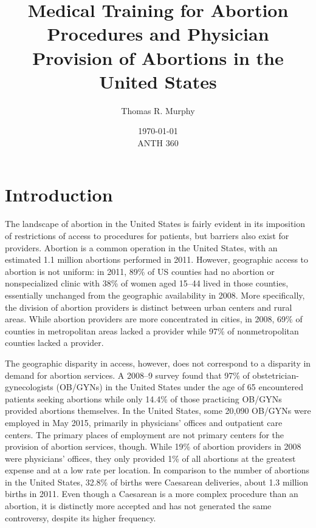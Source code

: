 \documentclass[letterpaper, 12pt]{article}
\title{Medical Training for Abortion Procedures and Physician Provision of Abortions in the United States}
\author{Thomas R. Murphy}
\date{\today\\ANTH 360}
\begin{document}
\maketitle


\section*{Introduction}

The landscape of abortion in the United States is fairly evident in its imposition of restrictions of access to procedures for patients, but barriers also exist for providers.
Abortion is a common operation in the United States, with an estimated 1.1 million abortions performed in 2011. \autocite[pg. 7]{jones_abortion_2014}
However, geographic access to abortion is not uniform: in 2011, 89\% of US counties had no abortion or nonspecialized clinic with 38\% of women aged 15--44 lived in those counties, essentially unchanged from the geographic availability in 2008. \autocite[pg. 7]{jones_abortion_2014}
More specifically, the division of abortion providers is distinct between urban centers and rural areas.
While abortion providers are more concentrated in cities, in 2008, 69\% of counties in metropolitan areas lacked a provider while 97\% of nonmetropolitan counties lacked a provider. \autocite[pg. 46]{jones_abortion_2011}

The geographic disparity in access, however, does not correspond to a disparity in demand for abortion services.
A 2008--9 survey found that 97\% of obstetrician-gynecologists (OB/GYNs) in the United States under the age of 65 encountered patients seeking abortions while only 14.4\% of those practicing OB/GYNs provided abortions themselves. \autocite[pg. 611]{stulberg_abortion_2011}
In the United States, some 20,090 OB/GYNs were employed in May 2015, primarily in physicians' offices and outpatient care centers. \autocite{occupational_employment_and_wages_may_2015}
The primary places of employment are not primary centers for the provision of abortion services, though.
While 19\% of abortion providers in 2008 were physicians' offices, they only provided 1\% of all abortions at the greatest expense and at a low rate per location. \autocite[pg. 46--7]{jones_abortion_2011}
In comparison to the number of abortions in the United States, 32.8\% of births were Caesarean deliveries, about 1.3 million births in 2011. \autocite[pg. 5]{martin_births_2013}
Even though a Caesarean is a more complex procedure than an abortion, it is distinctly more accepted and has not generated the same controversy, despite its higher frequency.
\end{document}
